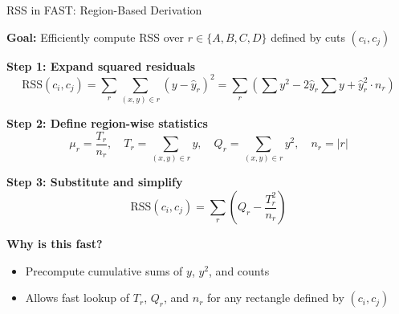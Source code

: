 \documentclass[11pt,compress,t,notes=noshow, aspectratio=169, xcolor=table]{beamer}
\begin{document}




\begin{frame}{RSS in FAST: Region-Based Derivation}

\textbf{Goal:} Efficiently compute RSS over $r \in \{A, B, C, D\}$ defined by cuts $(c_i, c_j)$

\textbf{Step 1: Expand squared residuals}
\[
\text{RSS}(c_i, c_j) = \sum_{r} \sum_{(x, y) \in r} (y - \hat{y}_r)^2
= \sum_{r} \left( \sum y^2 - 2 \hat{y}_r \sum y + \hat{y}_r^2 \cdot n_r \right)
\]

\textbf{Step 2: Define region-wise statistics}
\[
\mu_r = \frac{T_r}{n_r}, \quad
T_r = \sum_{(x, y) \in r} y, \quad
Q_r = \sum_{(x, y) \in r} y^2, \quad
n_r = |r|
\]

\textbf{Step 3: Substitute and simplify}
\[
\text{RSS}(c_i, c_j) = \sum_r \left( Q_r - \frac{T_r^2}{n_r} \right)
\]

\textbf{Why is this fast?}
\begin{itemize}
    \item Precompute cumulative sums of $y$, $y^2$, and counts
    \item Allows fast lookup of $T_r$, $Q_r$, and $n_r$ for any rectangle defined by $(c_i, c_j)$
\end{itemize}


\end{frame}
\end{document}
